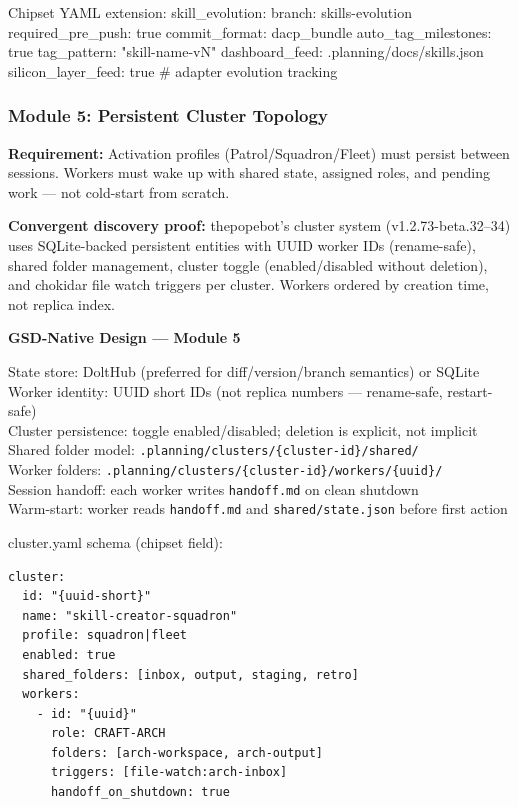 \documentclass[11pt,letterpaper]{article}
\begin{document}
\begin{asciibox}
Chipset YAML extension:
skill\_evolution:
  branch: skills-evolution
  required\_pre\_push: true
  commit\_format: dacp\_bundle
  auto\_tag\_milestones: true
  tag\_pattern: "skill-{name}-v{N}"
  dashboard\_feed: .planning/docs/skills.json
  silicon\_layer\_feed: true   \# adapter evolution tracking
\end{asciibox}

\subsubsection{Module 5: Persistent Cluster Topology}

\textbf{Requirement:} Activation profiles (Patrol/Squadron/Fleet) must persist between sessions. Workers must wake up with shared state, assigned roles, and pending work --- not cold-start from scratch.

\textbf{Convergent discovery proof:} thepopebot's cluster system (v1.2.73-beta.32--34) uses SQLite-backed persistent entities with UUID worker IDs (rename-safe), shared folder management, cluster toggle (enabled/disabled without deletion), and chokidar file watch triggers per cluster. Workers ordered by creation time, not replica index.

\begin{implbox}
\textbf{GSD-Native Design --- Module 5}

State store: DoltHub (preferred for diff/version/branch semantics) or SQLite\\
Worker identity: UUID short IDs (not replica numbers --- rename-safe, restart-safe)\\
Cluster persistence: toggle enabled/disabled; deletion is explicit, not implicit\\
Shared folder model: \texttt{.planning/clusters/\{cluster-id\}/shared/}\\
Worker folders: \texttt{.planning/clusters/\{cluster-id\}/workers/\{uuid\}/}\\
Session handoff: each worker writes \texttt{handoff.md} on clean shutdown\\
Warm-start: worker reads \texttt{handoff.md} and \texttt{shared/state.json} before first action

cluster.yaml schema (chipset field):
\begin{verbatim}
cluster:
  id: "{uuid-short}"
  name: "skill-creator-squadron"
  profile: squadron|fleet
  enabled: true
  shared_folders: [inbox, output, staging, retro]
  workers:
    - id: "{uuid}"
      role: CRAFT-ARCH
      folders: [arch-workspace, arch-output]
      triggers: [file-watch:arch-inbox]
      handoff_on_shutdown: true
\end{verbatim}
\end{implbox}
\end{document}
